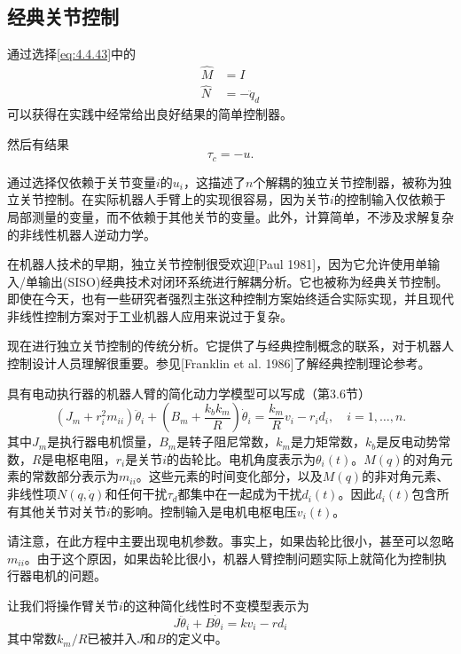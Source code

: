\documentclass[UTF8]{ctexart}
\theoremstyle{definition}
\begin{document}
\subsection{经典关节控制}

通过选择\eqref{eq:4.4.43}中的
\begin{align}
    \hat{M} &= I \\
    \hat{N} &= -\ddot{q}_d
\end{align}
可以获得在实践中经常给出良好结果的简单控制器。

然后有结果
\begin{equation}\label{eq:4.4.51}
    \tau_c = -u.
\end{equation}

通过选择仅依赖于关节变量$i$的$u_i$，这描述了$n$个解耦的独立关节控制器，被称为独立关节控制。在实际机器人手臂上的实现很容易，因为关节$i$的控制输入仅依赖于局部测量的变量，而不依赖于其他关节的变量。此外，计算简单，不涉及求解复杂的非线性机器人逆动力学。

在机器人技术的早期，独立关节控制很受欢迎[Paul 1981]，因为它允许使用单输入/单输出(SISO)经典技术对闭环系统进行解耦分析。它也被称为经典关节控制。即使在今天，也有一些研究者强烈主张这种控制方案始终适合实际实现，并且现代非线性控制方案对于工业机器人应用来说过于复杂。

现在进行独立关节控制的传统分析。它提供了与经典控制概念的联系，对于机器人控制设计人员理解很重要。参见[Franklin et al. 1986]了解经典控制理论参考。

具有电动执行器的机器人臂的简化动力学模型可以写成（第3.6节）
\begin{equation}\label{eq:4.4.52}
    \left(J_m + r_i^2 m_{ii}\right)\ddot{\theta}_i + \left(B_m + \frac{k_b k_m}{R}\right)\dot{\theta}_i = \frac{k_m}{R}v_i - r_i d_i, \quad i = 1,\ldots,n.
\end{equation}
其中$J_m$是执行器电机惯量，$B_m$是转子阻尼常数，$k_m$是力矩常数，$k_b$是反电动势常数，$R$是电枢电阻，$r_i$是关节$i$的齿轮比。电机角度表示为$\theta_i(t)$。$M(q)$的对角元素的常数部分表示为$m_{ii}$。这些元素的时间变化部分，以及$M(q)$的非对角元素、非线性项$N(q, \dot{q})$和任何干扰$\tau_d$都集中在一起成为干扰$d_i(t)$。因此$d_i(t)$包含所有其他关节对关节$i$的影响。控制输入是电机电枢电压$v_i(t)$。

请注意，在此方程中主要出现电机参数。事实上，如果齿轮比很小，甚至可以忽略$m_{ii}$。由于这个原因，如果齿轮比很小，机器人臂控制问题实际上就简化为控制执行器电机的问题。

让我们将操作臂关节$i$的这种简化线性时不变模型表示为
\begin{equation}\label{eq:4.4.53}
    J\ddot{\theta}_i + B\dot{\theta}_i = k v_i - r d_i
\end{equation}
其中常数$k_m/R$已被并入$J$和$B$的定义中。
\end{document}
